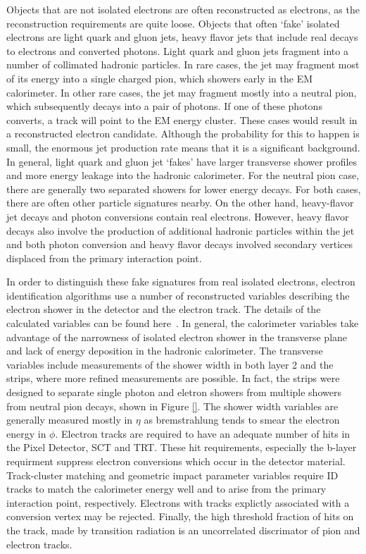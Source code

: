 Objects that are not isolated electrons are often reconstructed as electrons, as the reconstruction requirements are quite loose. Objects that often `fake' isolated electrons are light quark and gluon jets, heavy flavor jets that include real decays to electrons and converted photons. Light quark and gluon jets fragment into a number of collimated hadronic particles. In rare cases, the jet may fragment most of its energy into a single charged pion, which showers early in the EM calorimeter. In other rare cases, the jet may fragment mostly into a neutral pion, which subsequently decays into a pair of photons. If one of these photons converts, a track will point to the EM energy cluster. These cases would result in a reconstructed electron candidate. Although the probability for this to happen is small, the enormous jet production rate means that it is a significant background. In general, light quark and gluon jet `fakes' have larger transverse shower profiles and more energy leakage into the hadronic calorimeter. For the neutral pion case, there are generally two separated showers for lower energy decays. For both cases, there are often other particle signatures nearby.  
On the other hand, heavy-flavor jet decays and photon conversions contain real electrons. However, heavy flavor decays also involve the production of additional hadronic particles within the jet and both photon conversion and heavy flavor decays involved secondary vertices displaced from the primary interaction point. 

In order to distinguish these fake signatures from real isolated electrons, electron identification algorithms use a number of reconstructed variables describing the electron shower in the detector and the electron track. The details of the calculated variables can be found here~\cite{}. In general, the calorimeter variables take advantage of the narrowness of isolated electron shower in the transverse plane and lack of energy deposition in the hadronic calorimeter. The transverse variables include measurements of the shower width in both layer 2 and the strips, where more refined measurements are possible. In fact, the strips were designed to separate single photon and eletron showers from multiple showers from neutral pion decays, shown in Figure \ref{}. The shower width variables are generally measured mostly in $\eta$ as bremstrahlung tends to smear the electron energy in $\phi$. Electron tracks are required to have an adequate number of hits in the Pixel Detector, SCT and TRT. These hit requirements, especially the b-layer requirment suppress electron conversions which occur in the detector material. Track-cluster matching and geometric impact parameter variables require ID tracks to match the calorimeter energy well and to arise from the primary interaction point, respectively. Electrons with tracks explictly associated with a conversion vertex may be rejected. Finally, the high threshold fraction of hits on the track, made by transition radiation is an uncorrelated discrimator of pion and electron tracks.


